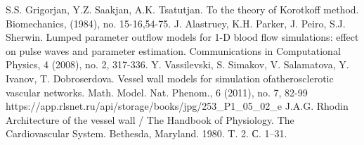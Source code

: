 \begin{thebibliography}{}
     S.S. Grigorjan, Y.Z. Saakjan, A.K. Tsatutjan. To the theory of Korotkoff method. Biomechanics, (1984), no. 15-16,54-75.
    J. Alastruey, K.H. Parker, J. Peiro, S.J. Sherwin. Lumped parameter outflow models for 1-D blood flow simulations: effect on pulse waves and parameter estimation. Communications in Computational Physics, 4 (2008), no. 2, 317-336.
     Y. Vassilevski, S. Simakov, V. Salamatova, Y. Ivanov, T. Dobroserdova. Vessel wall models for simulation ofatherosclerotic vascular networks. Math. Model. Nat. Phenom., 6 (2011), no. 7, 82-99
     https://app.rlsnet.ru/api/storage/books/jpg/253\_P1\_05\_02\_e
     J.A.G. Rhodin  Architecture of the vessel wall / The Handbook of Physiology. The Cardiovascular System. Bethesda, Maryland. 1980. T. 2. С. 1–31.
    
\end{thebibliography}
